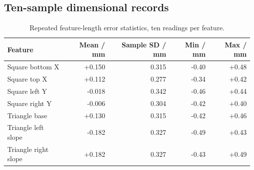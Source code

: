\subsection{Ten-sample dimensional records}\label{app:res-geometry-calculation}
\begin{table}[H]\centering\small
\begin{tabular}{lrrrr}
\toprule Feature & Mean / mm & Sample SD / mm & Min / mm & Max / mm\\\midrule
Square bottom X & +0.150 & 0.315 & -0.40 & +0.48\\
Square top X & +0.112 & 0.277 & -0.34 & +0.42\\
Square left Y & -0.018 & 0.342 & -0.46 & +0.44\\
Square right Y & -0.006 & 0.304 & -0.42 & +0.40\\
Triangle base & +0.130 & 0.315 & -0.42 & +0.46\\
Triangle left slope & -0.182 & 0.327 & -0.49 & +0.43\\
Triangle right slope & +0.182 & 0.327 & -0.43 & +0.49\\
\bottomrule\end{tabular}
\caption{Repeated feature-length error statistics, ten readings per feature.}\label{tab:app-gantry-features}\end{table}
